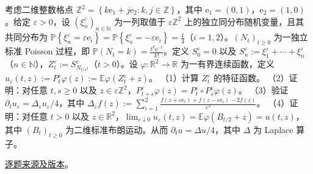 \begin{example}[公开题解转录]\label{q:fin15-high:12}

考虑二维整数格点 $\mathbb{Z}^{2} = \left\{k\mathrm{e}_{1} + j\mathrm{e}_{2} : k,j \in \mathbb{Z}\right\}$，其中 $\mathrm{e}_{1} = (0,1)$，$\mathrm{e}_{2} = (1,0)$。给定 $\varepsilon > 0$，设 $\left(\xi_{n}^{\varepsilon}\right)_{n \in \mathbb{N}}$ 为一列取值于 $\varepsilon\mathbb{Z}^{2}$ 上的独立同分布随机变量，且其共同分布为 $\mathbb{P}\left\{\xi_{n}^{\varepsilon} = \varepsilon\mathrm{e}_{i}\right\} = \mathbb{P}\left\{\xi_{n}^{\varepsilon} = -\varepsilon\mathrm{e}_{i}\right\} = \frac{1}{4}$（$i = 1,2$）。$\left(N_{t}\right)_{t \geq 0}$ 为一独立标准 Poisson 过程，即 $\mathbb{P}\left(N_{t} = k\right) = \frac{t^{k}\mathrm{e}^{-t}}{k!}$。定义 $S_{0}^{\varepsilon} = 0$ 以及 $S_{n}^{\varepsilon} := \xi_{1}^{\varepsilon} + \cdots + \xi_{n}^{\varepsilon}$（$n \in \mathbb{N}$），$Z_{t}^{\varepsilon} := S_{N_{t/\varepsilon^{2}}}^{\varepsilon}$（$t > 0$）。设 $\varphi: \mathbb{R}^{2} \rightarrow \mathbb{R}$ 为一有界连续函数，定义 $u_{\varepsilon}(t,z) := P_{t}^{\varepsilon}\varphi(z) := \mathbb{E}\varphi\left(Z_{t}^{\varepsilon} + z\right)$。
（1）计算 $Z_{t}^{\varepsilon}$ 的特征函数。
（2）证明：对任意 $t,s \geq 0$ 以及 $z \in \varepsilon\mathbb{Z}^{2}$，$P_{t+s}^{\varepsilon}\varphi(z) = P_{t}^{\varepsilon} \circ P_{s}^{\varepsilon}\varphi(z)$。
（3）验证 $\partial_{t}u_{\varepsilon} = \Delta_{\varepsilon}u_{\varepsilon}/4$，其中 $\Delta_{\varepsilon}f(z) := \sum_{i=1}^{2}\frac{f\left(z + \varepsilon\mathrm{e}_{i}\right) + f\left(z - \varepsilon\mathrm{e}_{i}\right) - 2f(z)}{\varepsilon^{2}}$。
（4）证明：对任意 $t > 0$ 以及 $z \in \mathbb{R}^2$，$\lim_{\varepsilon \downarrow 0}u_{\varepsilon}(t,z) = \mathbb{E}\varphi\left(B_{t/2} + z\right) = u(t,z)$，其中 $\left(B_{t}\right)_{t \geq 0}$ 为二维标准布朗运动。从而 $\partial_{t}u = \Delta u/4$，其中 $\Delta$ 为 Laplace 算子。

\end{example}

\href{https://github.com/lzxcr/cmc-mathematics/blob/64916fa1fdbc3e444a652eca204d5669058ee321/src/problems/finals/15/15.md}{逐题来源及版本}。

